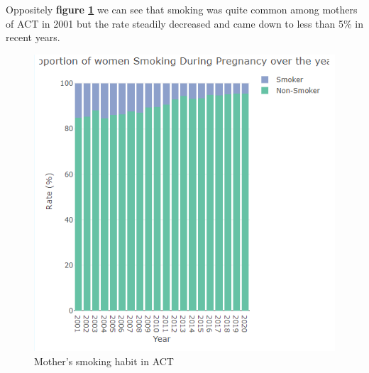 Oppositely \textbf{figure \ref{fig:smoking_prop}} we can see that smoking was quite common among mothers of ACT in 2001 but the rate steadily decreased and came down to less than 5\% in recent years.

\begin{figure}
  \centering
  \includegraphics[width=.75\textwidth]{subsections/smoking/smoking_proportion.png}
  \caption{Mother's smoking habit in ACT}
  \label{fig:smoking_prop}
\end{figure}


